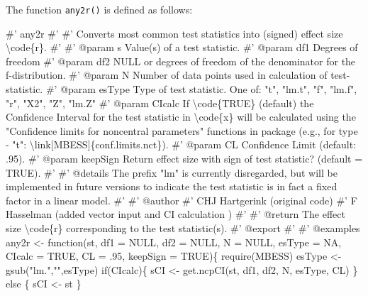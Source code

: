 \documentclass[]{article}
\newenvironment{Shaded}{\begin{snugshade}}{\end{snugshade}}
\newcommand{\KeywordTok}[1]{\textcolor[rgb]{0.94,0.87,0.69}{{#1}}}
\newcommand{\DataTypeTok}[1]{\textcolor[rgb]{0.87,0.87,0.75}{{#1}}}
\newcommand{\DecValTok}[1]{\textcolor[rgb]{0.86,0.86,0.80}{{#1}}}
\newcommand{\StringTok}[1]{\textcolor[rgb]{0.80,0.58,0.58}{{#1}}}
\newcommand{\CommentTok}[1]{\textcolor[rgb]{0.50,0.62,0.50}{{#1}}}
\newcommand{\OtherTok}[1]{\textcolor[rgb]{0.94,0.94,0.56}{{#1}}}
\newcommand{\NormalTok}[1]{\textcolor[rgb]{0.80,0.80,0.80}{{#1}}}
\begin{document}
The function \texttt{any2r()} is defined as follows:

\begin{Shaded}
\begin{Highlighting}[]
\CommentTok{#' any2r}
\CommentTok{#'}
\CommentTok{#' Converts most common test statistics into (signed) effect size \textbackslash{}code\{r\}.}
\CommentTok{#'}
\CommentTok{#' @param s     Value(s) of a test statistic.}
\CommentTok{#' @param df1     Degrees of freedom}
\CommentTok{#' @param df2     NULL or degrees of freedom of the denominator for the f-distribution.}
\CommentTok{#' @param N     Number of data points used in calculation of test-statistic.}
\CommentTok{#' @param esType     Type of test statistic. One of: "t", "lm.t", "f", "lm.f", "r", "X2", "Z", "lm.Z"}
\CommentTok{#' @param CIcalc     If \textbackslash{}code\{TRUE\} (default) the Confidence Interval for the test statistic in \textbackslash{}code\{x\} will be calculated using the "Confidence limits for noncentral parameters" functions in package (e.g., for type - "t": \textbackslash{}link[MBESS]\{conf.limits.nct\}).}
\CommentTok{#' @param CL    Confidence Limit (default: .95).}
\CommentTok{#' @param keepSign     Return effect size with sign of test statistic? (default = TRUE).}
\CommentTok{#'}
\CommentTok{#' @details The prefix "lm" is currently disregarded, but will be implemented in future versions to indicate the test statistic is in fact a fixed factor in a linear model.}
\CommentTok{#'}
\CommentTok{#' @author}
\CommentTok{#' CHJ Hartgerink (original code)}
\CommentTok{#' F Hasselman (added vector input and CI calculation )}
\CommentTok{#'}
\CommentTok{#' @return The effect size \textbackslash{}code\{r\} corresponding to the test statistic(s).}
\CommentTok{#' @export}
\CommentTok{#'}
\CommentTok{#' @examples}
\NormalTok{any2r <-}\StringTok{ }\NormalTok{function(st, }\DataTypeTok{df1 =} \OtherTok{NULL}\NormalTok{, }\DataTypeTok{df2 =} \OtherTok{NULL}\NormalTok{, }\DataTypeTok{N =} \OtherTok{NULL}\NormalTok{, }\DataTypeTok{esType =} \OtherTok{NA}\NormalTok{, }\DataTypeTok{CIcalc =} \OtherTok{TRUE}\NormalTok{, }\DataTypeTok{CL =} \NormalTok{.}\DecValTok{95}\NormalTok{, }\DataTypeTok{keepSign =} \OtherTok{TRUE}\NormalTok{)\{}
    \KeywordTok{require}\NormalTok{(MBESS)}
    \NormalTok{esType <-}\StringTok{ }\KeywordTok{gsub}\NormalTok{(}\StringTok{"lm."}\NormalTok{,}\StringTok{""}\NormalTok{,esType)}
    \NormalTok{if(CIcalc)\{}
        \NormalTok{sCI <-}\StringTok{ }\KeywordTok{get.ncpCI}\NormalTok{(st, df1, df2, N, esType, CL)}
    \NormalTok{\} else \{}
        \NormalTok{sCI <-}\StringTok{ }\NormalTok{st}
    \NormalTok{\}}


\end{Highlighting}
\end{Shaded}
\end{document}

